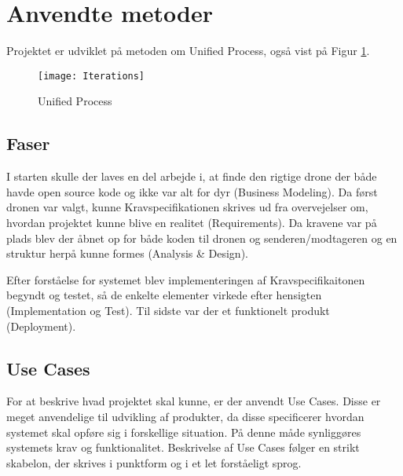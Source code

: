 \documentclass[Main]{subfiles}
\begin{document}
\section{Anvendte metoder}

Projektet er udviklet på metoden om Unified Process\cite[s. 74]{Larman}, også vist på Figur \ref{Fig:UP}.

\begin{figure}[H]
\centering
\texttt{[image: Iterations]}
\caption{Unified Process}
\label{Fig:UP}
\end{figure}



\subsection{Faser}
I starten skulle der laves en del arbejde i, at finde den rigtige drone der både havde open source kode og ikke var alt for dyr (Business Modeling).
Da først dronen var valgt, kunne Kravspecifikationen\cite{Kravspec} skrives ud fra overvejelser om, hvordan projektet kunne blive en realitet (Requirements).
Da kravene var på plads blev der åbnet op for både koden til dronen og senderen/modtageren og en struktur herpå kunne formes (Analysis \& Design).

Efter forståelse for systemet blev implementeringen af Kravspecifikaitonen begyndt og testet, så de enkelte elementer virkede efter hensigten (Implementation og Test).
Til sidste var der et funktionelt produkt (Deployment).




\subsection{Use Cases}
For at beskrive hvad projektet skal kunne, er der anvendt Use Cases.
Disse er meget anvendelige til udvikling af produkter, da disse specificerer hvordan systemet skal opføre sig i forskellige situation.
På denne måde synliggøres systemets krav og funktionalitet.
Beskrivelse af Use Cases følger en strikt skabelon, der skrives i punktform og i et let forståeligt sprog.
\end{document}
